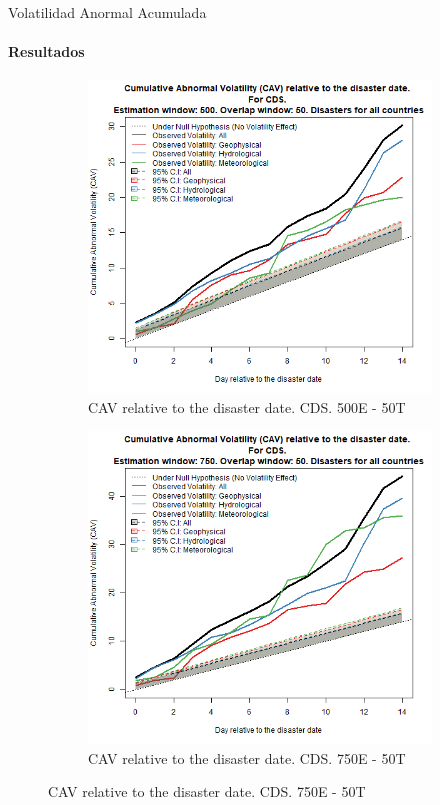 \documentclass{beamer}
\begin{document}
\begin{frame}{Volatilidad Anormal Acumulada}
\framesubtitle{Resultados}
    \begin{figure}
    \begin{subfigure}{0.45\textwidth}
        \centering
        \includegraphics[width=\linewidth]{../Graficos_Paper/CAV/Ag//cds_PM_CAV_Est_500_tra_50.png}
        \caption{CAV relative to the disaster date. CDS. 500E - 50T}
        \label{figure:cavcds50050}
    \end{subfigure}
    \hfill
    \begin{subfigure}{0.45\textwidth}
        \centering
        \includegraphics[width=\linewidth]{../Graficos_Paper/CAV/Ag//cds_PM_CAV_Est_750_tra_50.png}
        \caption{CAV relative to the disaster date. CDS. 750E - 50T}
        \label{figure:cavcds75050}
    \end{subfigure}
    \end{figure}
\end{frame}
\end{document}

